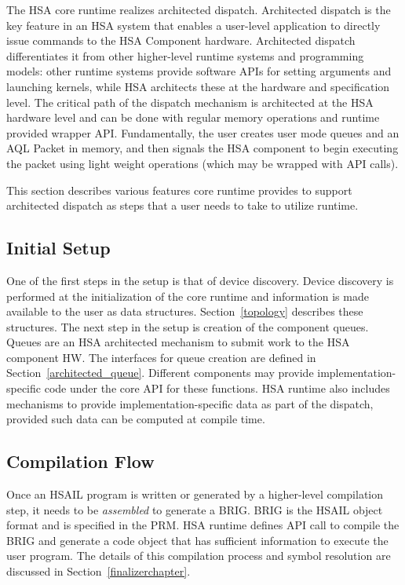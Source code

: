 The HSA core runtime realizes architected dispatch. Architected
dispatch is the key feature in an HSA system that enables a
user-\/level application to directly issue commands to the HSA
Component hardware.  Architected dispatch differentiates it from
other higher-\/level runtime systems and programming models\-: other
runtime systems provide software A\-P\-Is for setting arguments and
launching kernels, while H\-S\-A architects these at the hardware
and specification level.  The critical path of the dispatch
mechanism is architected at the H\-S\-A hardware level and can be
done with regular memory operations and runtime provided wrapper
API.  Fundamentally, the user creates user mode queues and an
A\-Q\-L Packet in memory, and then signals the HSA component to
begin executing the packet using light weight operations (which may
be wrapped with A\-P\-I calls).

This section describes various features core runtime provides to
support architected dispatch as steps that a user needs to take to
utilize runtime.

\subsection{Initial Setup}
One of the first steps in the setup is that of device discovery.
Device discovery is performed at the initialization of the core
runtime and information is made available to the user as data
structures. Section~\ref{topology} describes these structures.
The next step in the setup is creation of the
component queues. Queues are an HSA architected mechanism to submit
work to the HSA component HW. The interfaces for queue creation 
are defined in Section~\ref{architected_queue}. Different
components may provide
implementation-\/specific code under the core A\-P\-I for these
functions. H\-S\-A runtime also includes mechanisms to provide
implementation-\/specific data as part of the dispatch, provided
such data can be computed at compile time. 

\subsection{Compilation Flow}
Once an HSAIL program is written or generated by a higher-level
compilation step, it needs to be \emph{assembled} to generate a
BRIG. BRIG is the HSAIL object format and is specified in the PRM. 
HSA runtime defines API call to compile the BRIG and generate a code
object that has sufficient information to execute the user
program. The details of this compilation process and symbol
resolution are discussed in Section~\ref{finalizerchapter}.

